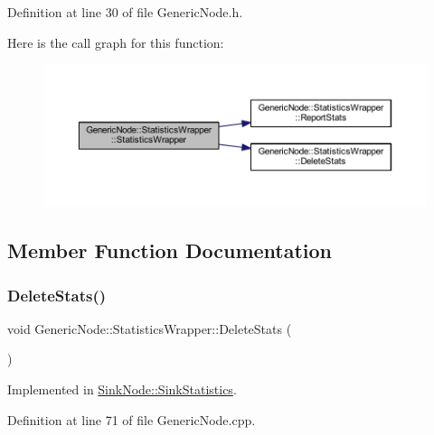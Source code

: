 Definition at line 30 of file Generic\+Node.\+h.

Here is the call graph for this function\+:
\nopagebreak
\begin{figure}[H]
\begin{center}
\leavevmode
\includegraphics[width=350pt]{class_generic_node_1_1_statistics_wrapper_a622a879b73b1607826c3bd5879366382_cgraph}
\end{center}
\end{figure}


\subsection{Member Function Documentation}
\mbox{\label{class_generic_node_1_1_statistics_wrapper_a08f3642bccd77ccf4d7a8b7010559e1c}} 
\subsubsection{\texorpdfstring{Delete\+Stats()}{DeleteStats()}}
{\footnotesize\ttfamily void Generic\+Node\+::\+Statistics\+Wrapper\+::\+Delete\+Stats (\begin{DoxyParamCaption}{ }\end{DoxyParamCaption})\hspace{0.3cm}{\ttfamily [pure virtual]}}



Implemented in \hyperlink{class_sink_node_1_1_sink_statistics_a9bd64cbc1cbe5f75ae5bd4971a3453b0}{Sink\+Node\+::\+Sink\+Statistics}.



Definition at line 71 of file Generic\+Node.\+cpp.

